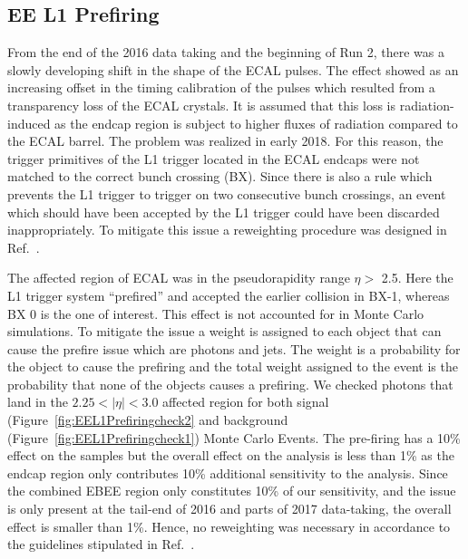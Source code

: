 \subsection{EE L1 Prefiring}
From the end of the 2016 data taking and the beginning of Run 2, there was a slowly developing shift in the shape of the ECAL pulses. The effect showed as an increasing offset in the timing calibration of the pulses which resulted from a transparency loss of the ECAL crystals. It is assumed that this loss is radiation-induced as the endcap region is subject to higher fluxes of radiation compared to the ECAL barrel. The problem was realized in early 2018. For this reason, the trigger primitives of the L1 trigger located in the ECAL endcaps were not matched to the correct bunch crossing (BX). Since there is also a rule which prevents the L1 trigger to trigger on two consecutive bunch crossings, an event which should have been accepted by the L1 trigger could have been discarded inappropriately. To mitigate this issue a reweighting procedure was designed in Ref.~\cite{CMS_Collaboration_reweighting}.

The affected region of ECAL was in the pseudorapidity range $\eta >$ 2.5. Here the L1 trigger system “prefired” and accepted the earlier collision in BX-1, whereas BX 0 is the one of interest. This effect is not accounted for in Monte Carlo simulations. To mitigate the issue a weight is assigned to each object that can cause the prefire issue which are photons and jets. The weight is a probability for the object to cause the prefiring and the total weight assigned to the event is the probability that none of the objects causes a prefiring. We checked photons that land in the $2.25 < |\eta| <3.0$ affected region for both signal (Figure~\ref{fig:EEL1Prefiringcheck2} and background (Figure~\ref{fig:EEL1Prefiringcheck1}) Monte Carlo Events. The pre-firing has a 10\% effect on the samples but the overall effect on the analysis is less than 1\% as the endcap region only contributes 10\% additional sensitivity to the analysis. Since the combined EBEE region only constitutes 10\% of our sensitivity, and the issue is only present at the tail-end of 2016 and parts of 2017 data-taking, the overall effect is smaller than 1\%. Hence, no reweighting was necessary in accordance to the guidelines stipulated in Ref.~\cite{CMS_Collaboration_reweighting}.

